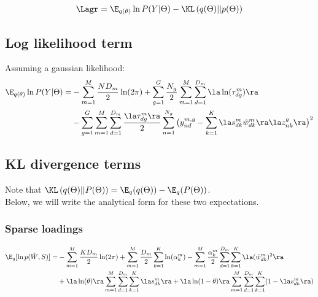 \begin{equation} \begin{aligned}
    \Lagr = \E_{q(\theta)} \ln P(Y|\Theta) - \KL\left(q(\Theta) \middle|\middle| p(\Theta) \right)
\end{aligned} \end{equation}


\subsection{Log likelihood term}
Assuming a gaussian likelihood:
\begin{equation} \begin{aligned}
	\E_{q(\theta)} \ln P(Y|\Theta) = & -\sum_{m=1}^M \frac{ND_m}{2} \ln(2\pi) + \sum_{g=1}^G \frac{N_g}{2} \sum_{m=1}^M \sum_{d=1}^{D_m} \la \ln(\tau_{dg}^m) \ra \\
	&-\sum_{g=1}^G \sum_{m=1}^M \sum_{d=1}^{D_m} \frac{\la \tau_{dg}^m \ra}{2} \sum_{n=1}^{N_g} \big( y_{nd}^{m,g} - \sum_{k=1}^{K}\la s_{dk}^m \hat{w}_{dk}^m \ra \la z_{nk}^g \ra \big)^2
\end{aligned} \end{equation}


\subsection{KL divergence terms}

Note that $\KL\left(q(\Theta) \middle|\middle| P(\Theta) \right) = \E_q(q(\Theta)) - \E_q(P(\Theta))$. \\
Below, we will write the analytical form for these two expectations.

\subsubsection*{Sparse loadings}

\begin{equation} \begin{aligned}
    \E_q[\ln p(\hat{W},S)] =& -\sum_{m=1}^{M}\frac{KD_m}{2}\ln(2\pi) + \sum_{m=1}^{M}\frac{D_m}{2}\sum_{k=1}^{K} \ln(\alpha_k^m) - \sum_{m=1}^{M} \frac{\alpha_k^m}{2} \sum_{d=1}^{D_m} \sum_{k=1}^{K} \la (\hat{w}_{dk}^m)^2 \ra \\
    & + \la \ln(\theta) \ra \sum_{m=1}^{M} \sum_{d=1}^{D_m} \sum_{k=1}^{K} \la s_{dk}^m \ra + \la \ln(1-\theta) \ra \sum_{m=1}^{M} \sum_{d=1}^{D_m}\sum_{k=1}^{K} (1- \la s_{dk}^m \ra)
\end{aligned} \end{equation}

